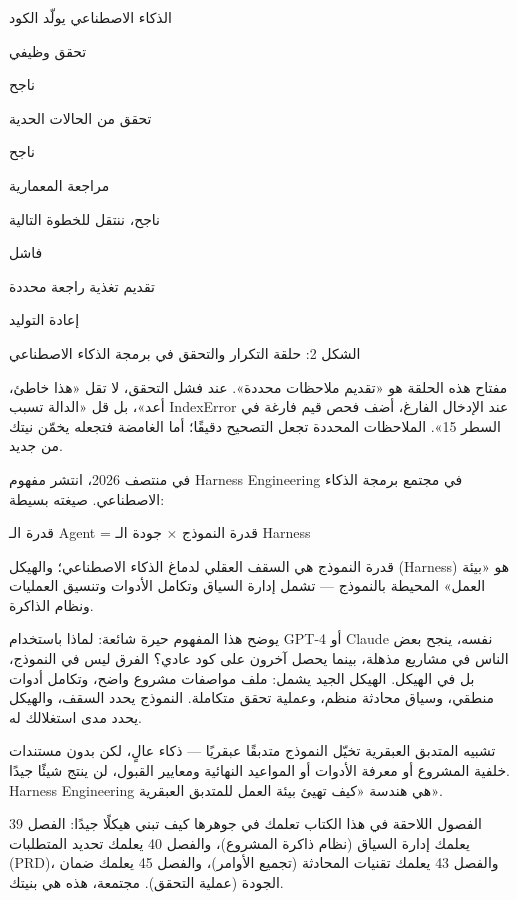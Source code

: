 الذكاء الاصطناعي يولّد الكود

تحقق وظيفي

ناجح

تحقق من الحالات الحدية

ناجح

مراجعة المعمارية

ناجح، ننتقل للخطوة التالية

فاشل

تقديم تغذية راجعة محددة

إعادة التوليد

\begin{center}\small\color{gray}الشكل 2: حلقة التكرار والتحقق في برمجة الذكاء الاصطناعي\end{center}

مفتاح هذه الحلقة هو «تقديم ملاحظات محددة». عند فشل التحقق، لا تقل «هذا خاطئ، أعد»، بل قل «الدالة تسبب IndexError عند الإدخال الفارغ، أضف فحص قيم فارغة في السطر 15». الملاحظات المحددة تجعل التصحيح دقيقًا؛ أما الغامضة فتجعله يخمّن نيتك من جديد.


في منتصف 2026، انتشر مفهوم Harness Engineering في مجتمع برمجة الذكاء الاصطناعي. صيغته بسيطة:

قدرة الـ Agent = قدرة النموذج × جودة الـ Harness

قدرة النموذج هي السقف العقلي لدماغ الذكاء الاصطناعي؛ والهيكل (Harness) هو «بيئة العمل» المحيطة بالنموذج — تشمل إدارة السياق وتكامل الأدوات وتنسيق العمليات ونظام الذاكرة.

يوضح هذا المفهوم حيرة شائعة: لماذا باستخدام GPT-4 أو Claude نفسه، ينجح بعض الناس في مشاريع مذهلة، بينما يحصل آخرون على كود عادي؟ الفرق ليس في النموذج، بل في الهيكل. الهيكل الجيد يشمل: ملف مواصفات مشروع واضح، وتكامل أدوات منطقي، وسياق محادثة منظم، وعملية تحقق متكاملة. النموذج يحدد السقف، والهيكل يحدد مدى استغلالك له.

\begin{tcbinfo}{تشبيه المتدبق العبقرية}
تخيّل النموذج متدبقًا عبقريًا — ذكاء عالٍ، لكن بدون مستندات خلفية المشروع أو معرفة الأدوات أو المواعيد النهائية ومعايير القبول، لن ينتج شيئًا جيدًا. Harness Engineering هي هندسة «كيف تهيئ بيئة العمل للمتدبق العبقرية».

\end{tcbinfo}

الفصول اللاحقة في هذا الكتاب تعلمك في جوهرها كيف تبني هيكلًا جيدًا: الفصل 39 يعلمك إدارة السياق (نظام ذاكرة المشروع)، والفصل 40 يعلمك تحديد المتطلبات (PRD)، والفصل 43 يعلمك تقنيات المحادثة (تجميع الأوامر)، والفصل 45 يعلمك ضمان الجودة (عملية التحقق). مجتمعة، هذه هي بنيتك.

